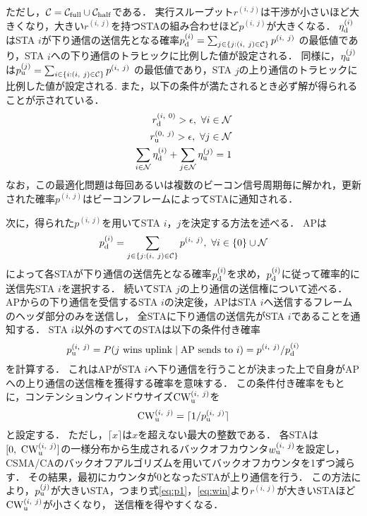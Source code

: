 \documentclass[technicalreport]{ieicej}
\newcommand{\sij}{(i,\ j)}
\newcommand{\mN}{{\mathcal N}}
\newcommand{\pij}{p^{(i,\ j)}}
\newcommand{\rij}{r^{\sij}}
\begin{document}
		ただし，${\mathcal C} = {\mathcal C}_{\rm full} \cup {\mathcal C}_{\rm half}$である．
		実行スループット$\rij$は干渉が小さいほど大きくなり，大きい$\rij$を持つSTAの組み合わせほど$p^{\sij}$が大きくなる．
		$\eta_{\rm d}^{(i)}$はSTA $i$が下り通信の送信先となる確率$p_{\rm d}^{(i)}=\sum_{j\in\{j:(i,\ j)\in{\mathcal C}\}} p^{(i,\ j)}$
		の最低値であり，STA $i$への下り通信のトラヒックに比例した値が設定される．
		同様に，$\eta_{\rm u}^{(j)}$は$p_{\rm u}^{(j)}=\sum_{i\in\{i:(i,\ j)\in{\mathcal C}\}} p^{(i,\ j)}$
		の最低値であり，STA $j$の上り通信のトラヒックに比例した値が設定される.
		また，以下の条件が満たされるとき必ず解が得られることが示されている．
		\begin{align}
			r_{\rm d}^{(i,\ 0)} >\epsilon,\ \forall i\in\mN \\
			r_{\rm u}^{(0,\ j)} >\epsilon,\ \forall j\in\mN \\
			\sum_{i\in\mN}\eta_{\rm d}^{(i)} + \sum_{j\in\mN}\eta_{\rm u}^{(j)} =1 \label{eq:feasible}
		\end{align}
		なお，この最適化問題は毎回あるいは複数のビーコン信号周期毎に解かれ，更新された確率$\pij$はビーコンフレームによってSTAに通知される．
		\par
		次に，得られた$\pij$を用いてSTA $i$，$j$を決定する方法を述べる．
		APは
		\begin{equation}
			p_{\rm d}^{(i)}= \sum_{j\in\{j:(i,\ j)\in{\mathcal C}\}}p^{(i,\ j)},\ \forall i \in \{0\}\cup{\mathcal N}
		\end{equation}
		によって各STAが下り通信の送信先となる確率$p_{\rm d}^{(i)}$を求め，$p_{\rm d}^{(i)}$に従って確率的に送信先STA $i$を選択する．
		続いてSTA $j$の上り通信の送信権について述べる．
		APからの下り通信を受信するSTA $i$の決定後，APはSTA $i$へ送信するフレームのヘッダ部分のみを送信し，
		全STAに下り通信の送信先がSTA $i$であることを通知する．
		STA $i$以外のすべてのSTAは以下の条件付き確率
		\begin{equation}
			p_{\rm u}^{\sij} = P(j\ {\rm wins\ uplink}\mid{\rm AP\ sends\ to}\ i)=\pij / p_{\rm d}^{(i)} \label{eq:win}
		\end{equation}
		を計算する．
		これはAPがSTA $i$へ下り通信を行うことが決まった上で自身がAPへの上り通信の送信権を獲得する確率を意味する．
		この条件付き確率をもとに，コンテンションウィンドウサイズ${\rm CW}^{\sij}_{\rm u}$を
		\begin{equation}
			{\rm CW}^{\sij}_{\rm u} = \lceil 1/p_{\rm u}^{\sij} \rceil
		\end{equation}
		と設定する．
		ただし，$\lceil x \rceil$は$x$を超えない最大の整数である．
		各STAは$[0,\ {\rm CW}^{\sij}_{\rm u}]$の一様分布から生成されるバックオフカウンタ$w_{\rm u}^{\sij}$を設定し，
		CSMA/CAのバックオフアルゴリズムを用いてバックオフカウンタを1ずつ減らす．
		その結果，最初にカウンタが0となったSTAが上り通信を行う．
		この方法により，$p_{\rm u}^{(j)}$が大きいSTA，つまり式\eqref{eq:p1}，\eqref{eq:win}より$r^{\sij}$が大きいSTAほど${\rm CW}^{\sij}_{\rm u}$が小さくなり，
		送信権を得やすくなる．
\end{document}
